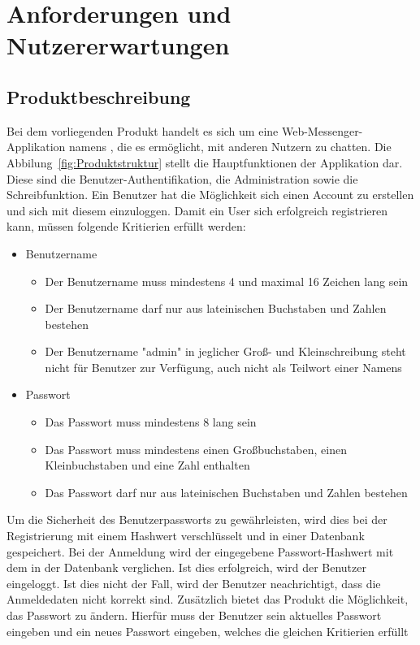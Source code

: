 \section{Anforderungen und Nutzererwartungen}

\subsection{Produktbeschreibung}
Bei dem vorliegenden Produkt handelt es sich um eine Web-Messenger-Applikation namens , die es ermöglicht, mit anderen Nutzern zu chatten. Die Abbilung~\ref{fig:Produktstruktur} stellt die Hauptfunktionen der Applikation dar. Diese sind die Benutzer-Authentifikation, die Administration sowie die Schreibfunktion. Ein Benutzer hat die Möglichkeit sich einen Account zu erstellen und sich mit diesem einzuloggen. Damit ein User sich erfolgreich registrieren kann, müssen folgende Kritierien erfüllt werden:
\begin{itemize}
  \item Benutzername
  \begin{itemize}
    \item Der Benutzername muss mindestens 4 und maximal 16 Zeichen lang sein
    \item Der Benutzername darf nur aus lateinischen Buchstaben und Zahlen bestehen
    \item Der Benutzername "admin" in jeglicher Groß- und Kleinschreibung steht nicht für Benutzer zur Verfügung, auch nicht als Teilwort einer Namens
  \end{itemize}
  \item Passwort
  \begin{itemize}
    \item Das Passwort muss mindestens 8 lang sein
    \item Das Passwort muss mindestens einen Großbuchstaben, einen Kleinbuchstaben und eine Zahl enthalten
    \item Das Passwort darf nur aus lateinischen Buchstaben und Zahlen bestehen
  \end{itemize}
\end{itemize}  
Um die Sicherheit des Benutzerpassworts zu gewährleisten, wird dies bei der Registrierung mit einem Hashwert verschlüsselt und in einer Datenbank gespeichert. Bei der Anmeldung wird der eingegebene Passwort-Hashwert mit dem in der Datenbank verglichen. Ist dies erfolgreich, wird der Benutzer eingeloggt. Ist dies nicht der Fall, wird der Benutzer neachrichtigt, dass die Anmeldedaten nicht korrekt sind. Zusätzlich bietet das Produkt die Möglichkeit, das Passwort zu ändern. Hierfür muss der Benutzer sein aktuelles Passwort eingeben und ein neues Passwort eingeben, welches die gleichen Kritierien erfüllt

